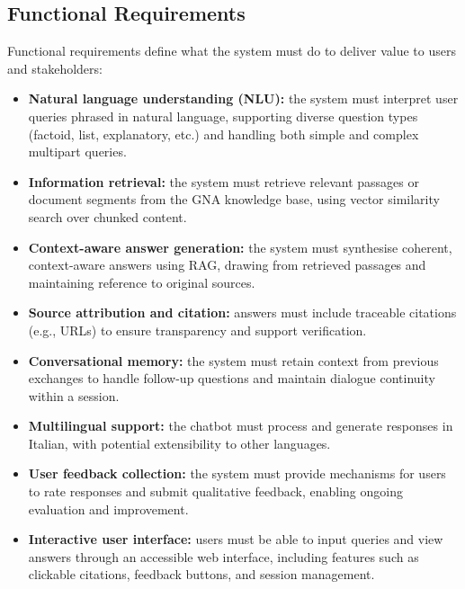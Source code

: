 \begin{spacing}{1.5}
\subsection{Functional Requirements}
Functional requirements define what the system must do to deliver value to users and stakeholders:
\begin{itemize}
    \item \textbf{Natural language understanding (NLU):} the system must interpret user queries phrased in natural language, supporting diverse question types (factoid, list, explanatory, etc.) and handling both simple and complex multipart queries.
    \item \textbf{Information retrieval:} the system must retrieve relevant passages or document segments from the GNA knowledge base, using vector similarity search over chunked content.
    \item \textbf{Context-aware answer generation:} the system must synthesise coherent, context-aware answers using RAG, drawing from retrieved passages and maintaining reference to original sources.
    \item \textbf{Source attribution and citation:} answers must include traceable citations (e.g., URLs) to ensure transparency and support verification.
    \item \textbf{Conversational memory:} the system must retain context from previous exchanges to handle follow-up questions and maintain dialogue continuity within a session.
    \item \textbf{Multilingual support:} the chatbot must process and generate responses in Italian, with potential extensibility to other languages.
    \item \textbf{User feedback collection:} the system must provide mechanisms for users to rate responses and submit qualitative feedback, enabling ongoing evaluation and improvement.
    \item \textbf{Interactive user interface:} users must be able to input queries and view answers through an accessible web interface, including features such as clickable citations, feedback buttons, and session management.
\end{itemize}


\end{spacing}
